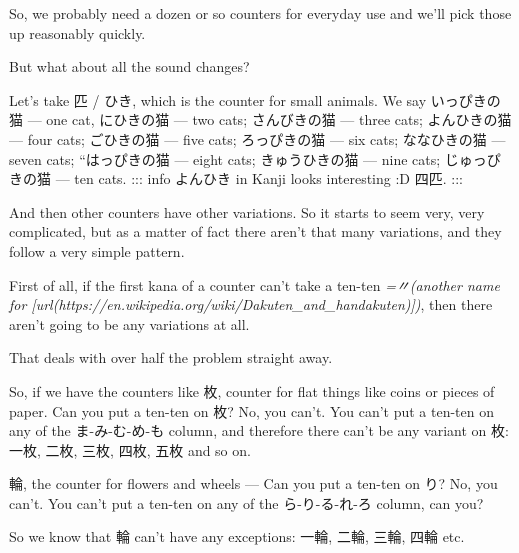 So, we probably need a dozen or so counters for everyday use and we'll pick those up reasonably quickly.

\stopsectionlevel

\stopsectionlevel

\startsectionlevel[title={The sound changes for counters},reference={the-sound-changes-for-counters}]

But what about all the sound changes?

Let's take 匹 / ひき, which is the counter for small animals. We say いっぴきの猫 --- one cat, にひきの猫 --- two cats; さんびきの猫 --- three cats; よんひきの猫 --- four cats; ごひきの猫 --- five cats; ろっぴきの猫 --- six cats; ななひきの猫 --- seven cats; “はっぴきの猫 --- eight cats; きゅうひきの猫 --- nine cats; じゅっぴきの猫 --- ten cats. ::: info よんひき in Kanji looks interesting :D 四匹. :::

{}

And then other counters have other variations. So it starts to seem very, very complicated, but as a matter of fact there aren't that many variations, and they follow a very simple pattern.

\startsectionlevel[title={Kana rows without sound changes - ま, ら, わ (+ I guess な, や if they exist)},reference={kana-rows-without-sound-changes---ま-ら-わ-i-guess-な-や-if-they-exist}]

\startsectionlevel[title={Rule 1},reference={rule-1}]

First of all, if the first kana of a counter can't take a ten-ten {\em =〃(another name for [url(https://en.wikipedia.org/wiki/Dakuten_and_handakuten)])}, then there aren't going to be any variations at all.

{}

That deals with over half the problem straight away.

\thinrule

So, if we have the counters like 枚, counter for flat things like coins or pieces of paper. Can you put a ten-ten on 枚? No, you can't. You can't put a ten-ten on any of the ま-み-む-め-も column, and therefore there can't be any variant on 枚: 一枚, 二枚, 三枚, 四枚, 五枚 and so on.

輪, the counter for flowers and wheels --- Can you put a ten-ten on り? No, you can't. You can't put a ten-ten on any of the ら-り-る-れ-ろ column, can you?

So we know that 輪 can't have any exceptions: 一輪, 二輪, 三輪, 四輪 etc.

